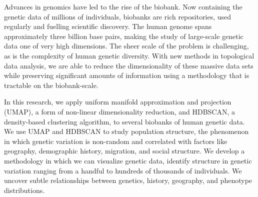 Advances in genomics have led to the rise of the biobank. Now containing the genetic data of millions of individuals, biobanks are rich repositories, used regularly and fuelling scientific discovery. The human genome spans approximately three billion base pairs, making the study of large-scale genetic data one of very high dimensions. The sheer scale of the problem is challenging, as is the complexity of human genetic diversity. With new methods in topological data analysis, we are able to reduce the dimensionality of these massive data sets while preserving significant amounts of information using a methodology that is tractable on the biobank-scale.

In this research, we apply uniform manifold approximation and projection (UMAP), a form of non-linear dimensionality reduction, and HDBSCAN, a density-based clustering algorithm, to several biobanks of human genetic data. We use UMAP and HDBSCAN to study population structure, the phenomenon in which genetic variation is non-random and correlated with factors like geography, demographic history, migration, and social structure. We develop a methodology in which we can visualize genetic data, identify structure in genetic variation ranging from a handful to hundreds of thousands of individuals. We uncover subtle relationships between genetics, history, geography, and phenotype distributions.